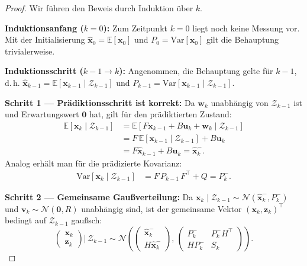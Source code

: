 ﻿\documentclass[a4paper,12pt]{article}
\theoremstyle{definition}
\begin{document}
\begin{proof}
Wir führen den Beweis durch Induktion über $k$.

\textbf{Induktionsanfang ($k=0$):}
Zum Zeitpunkt $k=0$ liegt noch keine Messung vor. Mit der Initialisierung
$\hat{\mathbf{x}}_0 = \mathbb{E}[\mathbf{x}_0]$ und
$P_0 = \mathrm{Var}[\mathbf{x}_0]$ gilt die Behauptung trivialerweise.

\textbf{Induktionsschritt ($k-1 \to k$):}
Angenommen, die Behauptung gelte für $k-1$, d.\,h.
$\hat{\mathbf{x}}_{k-1} = \mathbb{E}[\mathbf{x}_{k-1} \mid \mathcal{Z}_{k-1}]$
und $P_{k-1} = \mathrm{Var}[\mathbf{x}_{k-1} \mid \mathcal{Z}_{k-1}]$.

\textbf{Schritt 1 --- Prädiktionsschritt ist korrekt:}
Da $\mathbf{w}_k$ unabhängig von $\mathcal{Z}_{k-1}$ ist und Erwartungswert $\mathbf{0}$ hat,
gilt für den prädiktierten Zustand:
\begin{align*}
    \mathbb{E}[\mathbf{x}_k \mid \mathcal{Z}_{k-1}]
    &= \mathbb{E}[F\mathbf{x}_{k-1} + B\mathbf{u}_k + \mathbf{w}_k \mid \mathcal{Z}_{k-1}] \\
    &= F\,\mathbb{E}[\mathbf{x}_{k-1} \mid \mathcal{Z}_{k-1}] + B\mathbf{u}_k \\
    &= F\hat{\mathbf{x}}_{k-1} + B\mathbf{u}_k
    = \hat{\mathbf{x}}_k^-.
\end{align*}
Analog erhält man für die prädizierte Kovarianz:
\begin{align*}
    \mathrm{Var}[\mathbf{x}_k \mid \mathcal{Z}_{k-1}]
    &= F\,P_{k-1}\,F^\top + Q = P_k^-.
\end{align*}

\textbf{Schritt 2 --- Gemeinsame Gaußverteilung:}
Da $\mathbf{x}_k \mid \mathcal{Z}_{k-1} \sim \mathcal{N}(\hat{\mathbf{x}}_k^-, P_k^-)$ und
$\mathbf{v}_k \sim \mathcal{N}(\mathbf{0}, R)$ unabhängig sind, ist der gemeinsame Vektor
$(\mathbf{x}_k, \mathbf{z}_k)^\top$ bedingt auf $\mathcal{Z}_{k-1}$ gaußsch:
\[
    \begin{pmatrix}\mathbf{x}_k \\ \mathbf{z}_k \end{pmatrix}
    \Bigg|\, \mathcal{Z}_{k-1}
    \sim \mathcal{N}\!\left(
        \begin{pmatrix}\hat{\mathbf{x}}_k^- \\ H\hat{\mathbf{x}}_k^-\end{pmatrix},\,
        \begin{pmatrix}P_k^- & P_k^- H^\top \\ H P_k^- & S_k \end{pmatrix}
    \right).
\]


\end{proof}
\end{document}
